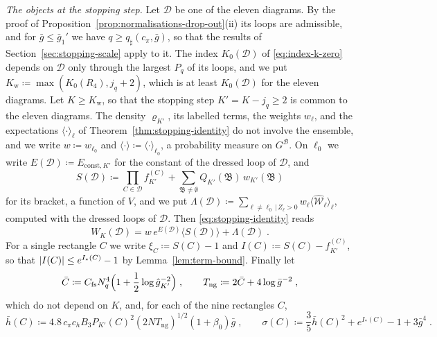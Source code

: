 \documentclass[11pt]{preprint}
\DeclarePairedDelimiter{\abs}{\lvert}{\rvert}
\numberwithin{equation}{section}
\theoremstyle{definition}
\theoremstyle{remark}
\theoremstyle{plain}
\begin{document}
\emph{The objects at the stopping step.} Let $\mathcal D$ be one of the eleven diagrams. By the proof of Proposition~\ref{prop:normalisations-drop-out}(ii) its loops are admissible, and for $\bar g \leq \bar g_1'$ we have $q \geq q_\sharp(c_\pi, \bar g)$, so that the results of Section~\ref{sec:stopping-scale} apply to it. The index $K_0(\mathcal D)$ of \eqref{eq:index-k-zero} depends on $\mathcal D$ only through the largest $P_q$ of its loops, and we put $K_{\mathrm w} \coloneqq \max(K_0(R_4), j_q + 2)$, which is at least $K_0(\mathcal D)$ for the eleven diagrams. Let $K \geq K_{\mathrm w}$, so that the stopping step $K' = K - j_q \geq 2$ is common to the eleven diagrams. The density $\varrho_{K'}$, its labelled terms, the weights $w_\ell$, and the expectations $\langle\cdot\rangle_\ell$ of Theorem~\ref{thm:stopping-identity} do not involve the ensemble, and we write $w \coloneqq w_{\ell_0}$ and $\langle\cdot\rangle \coloneqq \langle\cdot\rangle_{\ell_0}$, a probability measure on $G^{\mathcal B}$. On $\ell_0$ we write $E(\mathcal D) \coloneqq E_{\mathrm{const},K'}$ for the constant of the dressed loop of $\mathcal D$, and
\begin{equation}\label{eq:stopping-bracket}
    S(\mathcal D) \coloneqq \prod_{C \in \mathcal D}f^{(C)}_{K'} + \sum_{\mathfrak B \neq \emptyset}Q_{K'}(\mathfrak B)\,w_{K'}(\mathfrak B)
\end{equation}
for its bracket, a function of $V$, and we put $\Lambda(\mathcal D) \coloneqq \sum_{\ell \neq \ell_0 \,|\, Z_\ell > 0}w_\ell\langle\widehat{\mathcal W}_\ell\rangle_\ell$, computed with the dressed loops of $\mathcal D$. Then \eqref{eq:stopping-identity} reads
\begin{equation}\label{eq:pair-stopping-form}
    W_K(\mathcal D) = w\,e^{E(\mathcal D)}\bigl\langle S(\mathcal D)\bigr\rangle + \Lambda(\mathcal D)\;.
\end{equation}
For a single rectangle $C$ we write $\xi_C \coloneqq S(C) - 1$ and $I(C) \coloneqq S(C) - f^{(C)}_{K'}$, so that $\abs{I(C)} \leq e^{I_*(C)} - 1$ by Lemma~\ref{lem:term-bound}. Finally let
\begin{equation}\label{eq:typical-threshold}
    \bar C \coloneqq C_{\mathrm{fs}}N_q^4\Bigl(1 + \frac12\log\hat g_{K'}^{-2}\Bigr)\;,
    \qquad
    T_{\mathrm{ng}} \coloneqq 2\bar C + 4\log\bar g^{-2}\;,
\end{equation}
which do not depend on $K$, and, for each of the nine rectangles $C$,
\begin{equation}\label{eq:pair-sizes}
    \bar h(C) \coloneqq 4.8\,c_\pi c_hB_3P_{K'}(C)^2(2NT_{\mathrm{ng}})^{1/2}(1 + \beta_0)\bar g\;,
    \qquad
    \sigma(C) \coloneqq \frac35\bar h(C)^2 + e^{I_*(C)} - 1 + 3\bar g^4\;.
\end{equation}
\end{document}
